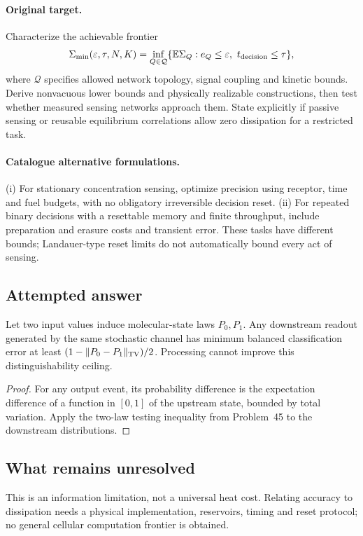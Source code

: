 \documentclass[11pt]{article}
\begin{document}
\paragraph{Original target.}
Characterize the achievable frontier
\[\Sigma_{\min}(\varepsilon,\tau,N,K)=\inf_{Q\in\mathcal Q}\{\mathbb{E}\Sigma_Q:e_Q\le\varepsilon,\ t_{\rm decision}\le\tau\},\]
where $\mathcal Q$ specifies allowed network topology, signal coupling and kinetic bounds. Derive nonvacuous lower bounds and physically realizable constructions, then test whether measured sensing networks approach them. State explicitly if passive sensing or reusable equilibrium correlations allow zero dissipation for a restricted task.
\paragraph{Catalogue alternative formulations.}
(i) For stationary concentration sensing, optimize precision using receptor, time and fuel budgets, with no obligatory irreversible decision reset. (ii) For repeated binary decisions with a resettable memory and finite throughput, include preparation and erasure costs and transient error. These tasks have different bounds; Landauer-type reset limits do not automatically bound every act of sensing.
\subsection{Attempted answer}
\begin{proposition}
Let two input values induce molecular-state laws $P_0,P_1$. Any downstream readout generated by the same stochastic channel has minimum balanced classification error at least $(1-\|P_0-P_1\|_{\rm TV})/2$. Processing cannot improve this distinguishability ceiling.
\end{proposition}
\begin{proof}
For any output event, its probability difference is the expectation difference of a function in $[0,1]$ of the upstream state, bounded by total variation. Apply the two-law testing inequality from Problem~45 to the downstream distributions.
\end{proof}
\subsection{What remains unresolved}
This is an information limitation, not a universal heat cost. Relating accuracy to dissipation needs a physical implementation, reservoirs, timing and reset protocol; no general cellular computation frontier is obtained.
\end{document}
